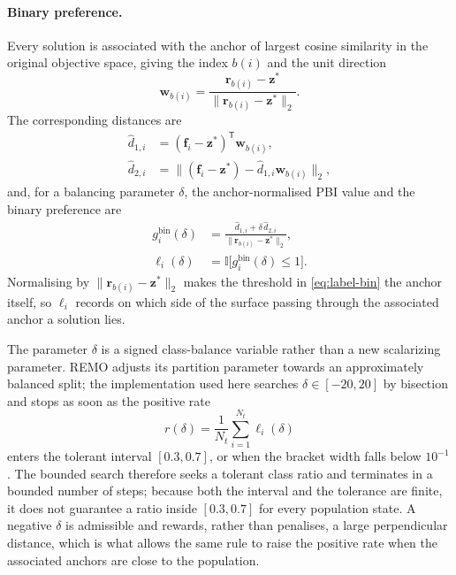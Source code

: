 \documentclass[11pt,a4paper]{article}
\newcommand{\vf}{\mathbf{f}}
\newcommand{\vw}{\mathbf{w}}
\newcommand{\vr}{\mathbf{r}}
\newcommand{\vz}{\mathbf{z}}
\begin{document}
\paragraph{Binary preference.}
Every solution is associated with the anchor of largest cosine similarity in the
original objective space, giving the index $b(i)$ and the unit direction
\begin{equation}
\vw_{b(i)}=\frac{\vr_{b(i)}-\vz^{*}}{\|\vr_{b(i)}-\vz^{*}\|_2}.
\label{eq:anchor-dir}
\end{equation}
The corresponding distances are
\begin{align}
\hat d_{1,i}&=(\vf_i-\vz^{*})^{\mathsf T}\vw_{b(i)},
\label{eq:d1hat}\\[2pt]
\hat d_{2,i}&=\bigl\|(\vf_i-\vz^{*})-\hat d_{1,i}\vw_{b(i)}\bigr\|_2 ,
\label{eq:d2hat}
\end{align}
and, for a balancing parameter $\delta$, the anchor-normalised PBI value and the
binary preference are
\begin{align}
g_i^{\mathrm{bin}}(\delta)
&=\frac{\hat d_{1,i}+\delta\,\hat d_{2,i}}{\|\vr_{b(i)}-\vz^{*}\|_2},
\label{eq:gbin}\\[2pt]
\ell_i(\delta)
&=\mathbb{I}\bigl[g_i^{\mathrm{bin}}(\delta)\leq1\bigr].
\label{eq:label-bin}
\end{align}
Normalising by $\|\vr_{b(i)}-\vz^{*}\|_2$ makes the threshold in
\eqref{eq:label-bin} the anchor itself, so $\ell_i$ records on which side of the
surface passing through the associated anchor a solution lies.

The parameter $\delta$ is a signed class-balance variable rather than a new
scalarizing parameter. REMO adjusts its partition parameter towards an
approximately balanced split; the implementation used here searches
$\delta\in[-20,20]$ by bisection and stops as soon as the positive rate
\begin{equation}
r(\delta)=\frac{1}{N_t}\sum_{i=1}^{N_t}\ell_i(\delta)
\label{eq:posrate}
\end{equation}
enters the tolerant interval $[0.3,0.7]$, or when the bracket width falls below
$10^{-1}$. The bounded search therefore seeks a tolerant class ratio and
terminates in a bounded number of steps; because both the interval and the
tolerance are finite, it does not guarantee a ratio inside $[0.3,0.7]$ for every
population state. A negative $\delta$ is admissible and rewards, rather than
penalises, a large perpendicular distance, which is what allows the same rule to
raise the positive rate when the associated anchors are close to the population.
\end{document}
